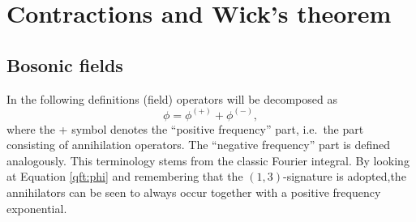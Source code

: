 \section{Contractions and Wick's theorem}
\subsection{Bosonic fields}

    In the following definitions (field) operators will be decomposed as \[\phi = \phi^{(+)} + \phi^{(-)},\] where the + symbol denotes the ``positive frequency'' part, i.e.~the part consisting of annihilation operators. The ``negative frequency'' part is defined analogously. This terminology stems from the classic Fourier integral. By looking at Equation \eqref{qft:phi} and remembering that the $(1,3)$-signature is adopted,the annihilators can be seen to always occur together with a positive frequency exponential.



